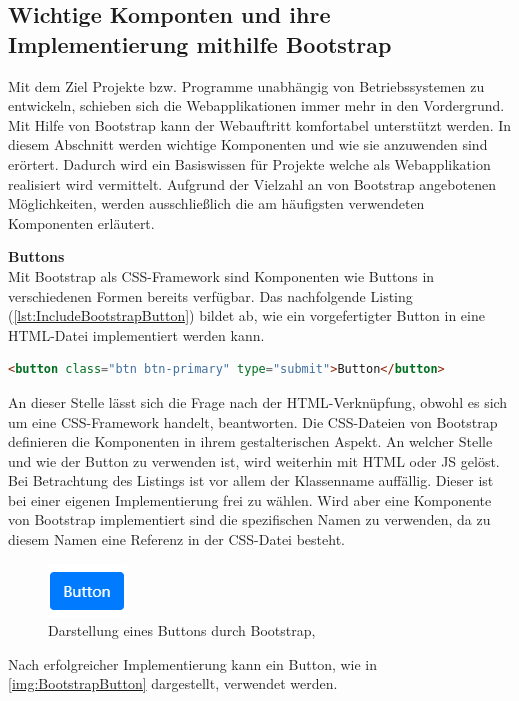 \documentclass[a4paper,titlepage,halfparskip,12pt]{scrreprt}
\begin{document}
\begin{onehalfspacing}
\subsection*{Wichtige Komponten und ihre Implementierung mithilfe Bootstrap}
\label{BootstrapComponents}
Mit dem Ziel Projekte bzw. Programme unabhängig von Betriebssystemen zu entwickeln, schieben sich die Webapplikationen immer mehr in den Vordergrund. Mit Hilfe von Bootstrap kann der Webauftritt komfortabel unterstützt werden. In diesem Abschnitt werden wichtige Komponenten und wie sie anzuwenden sind erörtert. Dadurch wird ein Basiswissen für Projekte welche als Webapplikation realisiert wird vermittelt. Aufgrund der Vielzahl an von Bootstrap angebotenen Möglichkeiten, werden ausschließlich die am häufigsten verwendeten Komponenten erläutert.

\textbf{Buttons}\\
Mit Bootstrap als CSS-Framework sind Komponenten wie Buttons in verschiedenen Formen bereits verfügbar. Das nachfolgende Listing (\autoref{lst:IncludeBootstrapButton}) bildet ab, wie ein vorgefertigter Button in eine HTML-Datei implementiert werden kann.
\begin{lstlisting}[language=HTML,caption=Implmentierung eines vorgerftigten Buttons,label={lst:IncludeBootstrapButton}]
<button class="btn btn-primary" type="submit">Button</button>
\end{lstlisting}
An dieser Stelle lässt sich die Frage nach der HTML-Verknüpfung, obwohl es sich um eine CSS-Framework handelt, beantworten. Die CSS-Dateien von Bootstrap definieren die Komponenten in ihrem gestalterischen Aspekt. An welcher Stelle und wie der Button zu verwenden ist, wird weiterhin mit \ac{HTML} oder \ac{JS} gelöst. Bei Betrachtung des Listings ist vor allem der Klassenname auffällig. Dieser ist bei einer eigenen Implementierung frei zu wählen. Wird aber eine Komponente von Bootstrap implementiert sind die spezifischen Namen zu verwenden, da zu diesem Namen eine Referenz in der CSS-Datei besteht.
\begin{figure}[h]
	\centering
	\includegraphics[scale=2.1]{images/BootstrapButton}
	\caption{Darstellung eines Buttons durch Bootstrap, \cite{bootstrapOnline}} 
	\label{img:BootstrapButton}
\end{figure}
Nach erfolgreicher Implementierung kann ein Button, wie in \autoref{img:BootstrapButton} dargestellt, verwendet werden.


\end{onehalfspacing}
\end{document}
